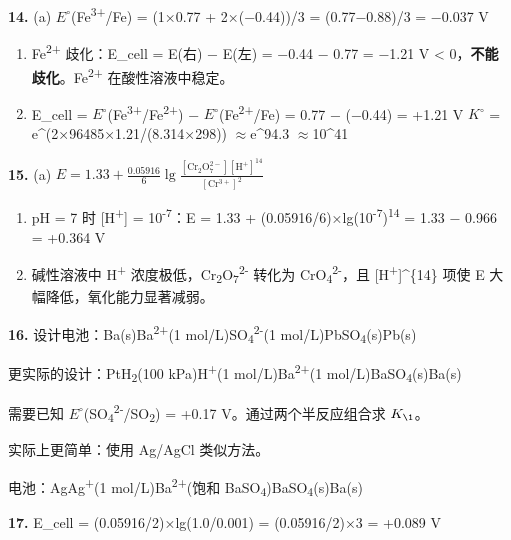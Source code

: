 \documentclass[a4paper,11pt]{ctexart}
\newcommand{\箭}{\ensuremath{\rightarrow}}
\newcommand{\左箭}{\ensuremath{\leftarrow}}
\newcommand{\上箭}{\ensuremath{\uparrow}}
\newcommand{\下箭}{\ensuremath{\downarrow}}
\newcommand{\衡}{\ensuremath{\rightleftharpoons}}
\newcommand{\双箭}{\ensuremath{\leftrightarrow}}
\newcommand{\约等于}{\ensuremath{\approx}}
\newcommand{\小于等于}{\ensuremath{\leq}}
\newcommand{\大于等于}{\ensuremath{\geq}}
\newcommand{\不等于}{\ensuremath{\neq}}
\newcommand{\西格马}{\ensuremath{\sigma}}
\newcommand{\派}{\ensuremath{\pi}}
\begin{document}
\textbf{14.}
(a) \(E^{\circ}\)(Fe\textsuperscript{3+}/Fe) = (1×0.77 + 2×(−0.44))/3 = (0.77−0.88)/3 = −0.037 V

\begin{enumerate}
\def\labelenumi{(\alph{enumi})}
\setcounter{enumi}{1}
\item
  Fe\textsuperscript{2+} 歧化：E\_cell = E(右) − E(左) = −0.44 − 0.77 = −1.21 V \textless{} 0，\textbf{不能歧化}。Fe\textsuperscript{2+} 在酸性溶液中稳定。
\item
  E\_cell = \(E^{\circ}\)(Fe\textsuperscript{3+}/Fe\textsuperscript{2+}) − \(E^{\circ}\)(Fe\textsuperscript{2+}/Fe) = 0.77 − (−0.44) = +1.21 V
  \(K^{\circ}\) = e\^{}(2×96485×1.21/(8.314×298)) \约等于 e\^{}94.3 \约等于 10\^{}41
\end{enumerate}

\textbf{15.}
(a) \(E = 1.33 + \frac{0.05916}{6}\lg\frac{[\mathrm{Cr_2O_7^{2-}}][\mathrm{H^+}]^{14}}{[\mathrm{Cr^{3+}}]^2}\)

\begin{enumerate}
\def\labelenumi{(\alph{enumi})}
\setcounter{enumi}{1}
\item
  pH = 7 时 {[}H\textsuperscript{+}{]} = 10\textsuperscript{-7}：E = 1.33 + (0.05916/6)×lg(10\textsuperscript{-7})\textsuperscript{14} = 1.33 − 0.966 = +0.364 V
\item
  碱性溶液中 H\textsuperscript{+} 浓度极低，Cr\textsubscript{2}O\textsubscript{7}\textsuperscript{2-} 转化为 CrO\textsubscript{4}\textsuperscript{2-}，且 {[}H\textsuperscript{+}{]}\^{}\{14\} 项使 E 大幅降低，氧化能力显著减弱。
\end{enumerate}

\textbf{16.} 设计电池：Ba(s)\textbar Ba\textsuperscript{2+}(1 mol/L)\textbar\textbar SO\textsubscript{4}\textsuperscript{2-}(1 mol/L)\textbar PbSO\textsubscript{4}(s)\textbar Pb(s)

更实际的设计：Pt\textbar H\textsubscript{2}(100 kPa)\textbar H\textsuperscript{+}(1 mol/L)\textbar\textbar Ba\textsuperscript{2+}(1 mol/L)\textbar BaSO\textsubscript{4}(s)\textbar Ba(s)

需要已知 \(E^{\circ}\)(SO\textsubscript{4}\textsuperscript{2-}/SO\textsubscript{2}) = +0.17 V。通过两个半反应组合求 \(K_{\1}\)。

实际上更简单：使用 Ag/AgCl 类似方法。

电池：Ag\textbar Ag\textsuperscript{+}(1 mol/L)\textbar\textbar Ba\textsuperscript{2+}(饱和 BaSO\textsubscript{4})\textbar BaSO\textsubscript{4}(s)\textbar Ba(s)

\textbf{17.} E\_cell = (0.05916/2)×lg(1.0/0.001) = (0.05916/2)×3 = +0.089 V
\end{document}
